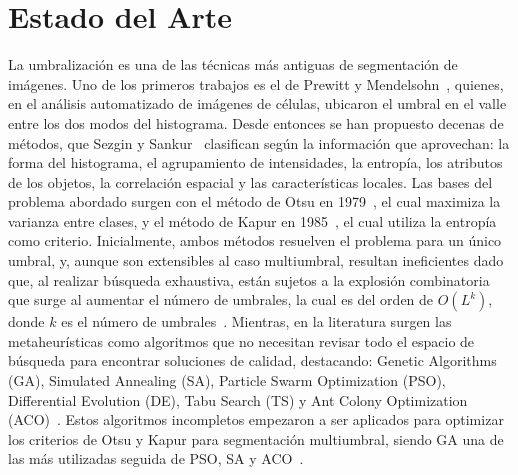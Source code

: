 \documentclass[letter, 10pt]{article}
\begin{document}
\section{Estado del Arte}
\label{sec:estado}

La umbralizaci\'on es una de las t\'ecnicas m\'as antiguas de segmentaci\'on de im\'agenes. Uno de los primeros trabajos es el de Prewitt y Mendelsohn~\cite{Prewitt1966Cell}, quienes, en el an\'alisis automatizado de im\'agenes de c\'elulas, ubicaron el umbral en el valle entre los dos modos del histograma. Desde entonces se han propuesto decenas de m\'etodos, que Sezgin y Sankur~\cite{Sezgin2004Survey} clasifican seg\'un la informaci\'on que aprovechan: la forma del histograma, el agrupamiento de intensidades, la entrop\'ia, los atributos de los objetos, la correlaci\'on espacial y las caracter\'isticas locales.
Las bases del problema abordado surgen con el m\'etodo de Otsu en 1979~\cite{Otsu1979}, el cual maximiza la varianza entre clases, y el m\'etodo de Kapur en 1985~\cite{Kapur1985}, el cual utiliza la entrop\'ia como criterio.
Inicialmente, ambos m\'etodos resuelven el problema para un \'unico umbral, y, aunque son extensibles al caso multiumbral, resultan ineficientes dado que, al realizar b\'usqueda exhaustiva,
est\'an sujetos a la explosi\'on combinatoria que surge al aumentar el n\'umero de umbrales, la cual es del orden de $O(L^{k})$, donde $k$ es el n\'umero de umbrales~\cite{Manikandan2014Multilevel, Hammouche2010Comparative}.
Mientras, en la literatura surgen las metaheur\'isticas como algoritmos que no necesitan revisar todo el espacio de b\'usqueda para encontrar soluciones de calidad, destacando:
Genetic Algorithms (GA), Simulated Annealing (SA), Particle Swarm Optimization (PSO), Differential Evolution (DE), Tabu Search (TS) y Ant Colony Optimization (ACO)~\cite{Hammouche2010Comparative}.
Estos algoritmos incompletos empezaron a ser aplicados para optimizar los criterios de Otsu y Kapur para segmentaci\'on multiumbral,
siendo GA una de las m\'as utilizadas seguida de PSO, SA y ACO~\cite{Hammouche2010Comparative}.
\end{document}
